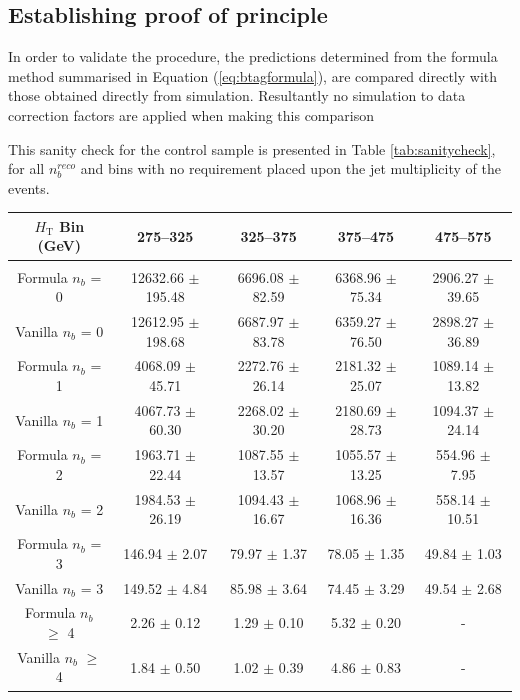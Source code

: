 \subsection{Establishing proof of principle}
\label{subsec:formulamethodsanity}

In order to validate the procedure, the predictions determined from the formula method summarised in Equation (\ref{eq:btagformula}), are compared directly with those obtained directly from simulation. Resultantly no simulation to data correction factors are applied when making this comparison

This sanity check for the \mupjets control sample is presented in Table \ref{tab:sanitycheck}, for all $n_{b}^{reco}$ and \theht bins with no requirement placed upon the jet multiplicity of the events.  


\begin{table}[ht!]
\begin{center}
\footnotesize
\begin{tabular*}{0.95\textwidth}{@{\extracolsep{\fill}}ccccc}
\hline
$H_{\textrm{T}}$ Bin (GeV)         & 275--325                  & 325--375                  & 375--475                  & 475--575                 \\ 
\hline\hline
\\
Formula $n_{b}$ = 0                 & 12632.66  $\pm$  195.48   & 6696.08  $\pm$  82.59     & 6368.96  $\pm$  75.34     & 2906.27  $\pm$  39.65    \\
Vanilla $n_{b}$ = 0                 & 12612.95  $\pm$  198.68   & 6687.97  $\pm$  83.78     & 6359.27  $\pm$  76.50     & 2898.27  $\pm$  36.89    \\
\hline
Formula $n_{b}$ = 1                 & 4068.09  $\pm$  45.71     & 2272.76  $\pm$  26.14     & 2181.32  $\pm$  25.07     & 1089.14  $\pm$  13.82    \\
Vanilla $n_{b}$ = 1                 & 4067.73  $\pm$  60.30     & 2268.02  $\pm$  30.20     & 2180.69  $\pm$  28.73     & 1094.37  $\pm$  24.14    \\
\hline
Formula $n_{b}$ = 2                  & 1963.71  $\pm$  22.44     & 1087.55  $\pm$  13.57     & 1055.57  $\pm$  13.25     & 554.96  $\pm$  7.95      \\
Vanilla $n_{b}$ = 2                  & 1984.53  $\pm$  26.19     & 1094.43  $\pm$  16.67     & 1068.96  $\pm$  16.36     & 558.14  $\pm$  10.51     \\
\hline
Formula $n_{b}$ = 3                  & 146.94  $\pm$  2.07       & 79.97  $\pm$  1.37        & 78.05  $\pm$  1.35        & 49.84  $\pm$  1.03       \\
Vanilla $n_{b}$ = 3                  & 149.52  $\pm$  4.84       & 85.98  $\pm$  3.64        & 74.45  $\pm$  3.29        & 49.54  $\pm$  2.68       \\
\hline
Formula $n_{b}$ $\geq$ 4             & 2.26  $\pm$  0.12         & 1.29  $\pm$  0.10         & 5.32  $\pm$  0.20         & -     \\ 
Vanilla $n_{b}$ $\geq$ 4             & 1.84  $\pm$  0.50         & 1.02  $\pm$  0.39         & 4.86  $\pm$  0.83       & -        \\ 


\end{tabular*}
\end{center}
\end{table}
